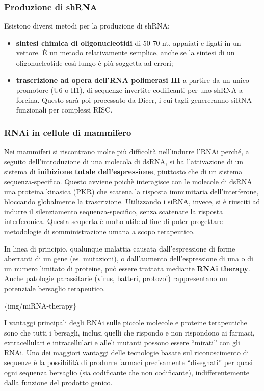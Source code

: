 \documentclass[]{article}
\begin{document}
\subsubsection{Produzione di shRNA}\label{produzione-di-shrna}

Esistono diversi metodi per la produzione di shRNA:

\begin{itemize}
\itemsep1pt\parskip0pt
\item
  \textbf{sintesi chimica di oligonucleotidi} di 50-70 nt, appaiati e
  ligati in un vettore. È un metodo relativamente semplice, anche se la
  sintesi di un oligonucleotide così lungo è più soggetta ad errori;
\item
  \textbf{trascrizione ad opera dell'RNA polimerasi III} a partire da un
  unico promotore (U6 o H1), di sequenze invertite codificanti per uno
  shRNA a forcina. Questo sarà poi processato da Dicer, i cui tagli
  genereranno siRNA funzionali per complessi RISC.
\end{itemize}

\subsubsection{RNAi in cellule di
mammifero}\label{rnai-in-cellule-di-mammifero}

Nei mammiferi si riscontrano molte più difficoltà nell'indurre l'RNAi
perché, a seguito dell'introduzione di una molecola di dsRNA, si ha
l'attivazione di un sistema di \textbf{inibizione totale
dell'espressione}, piuttosto che di un sistema sequenza-specifico.
Questo avviene poichè interagisce con le molecole di dsRNA una proteina
kinasica (PKR) che scatena la risposta immunitaria dell'interferone,
bloccando globalmente la trascrizione. Utilizzando i siRNA, invece, si è
riusciti ad indurre il silenziamento sequenza-specifico, senza scatenare
la risposta interferonica. Questa scoperta è molto utile al fine di
poter progettare metodologie di somministrazione umana a scopo
terapeutico.

In linea di principio, qualunque malattia causata dall'espressione di
forme aberranti di un gene (es. mutazioni), o dall'aumento
dell'espressione di una o di un numero limitato di proteine, può essere
trattata mediante \textbf{RNAi therapy}. Anche patologie parassitarie
(virus, batteri, protozoi) rappresentano un potenziale bersaglio
terapeutico.

\{img/miRNA-therapy\}

I vantaggi principali degli RNAi sulle piccole molecole e proteine
terapeutiche sono che tutti i bersagli, inclusi quelli che rispondo e
non rispondono ai farmaci, extracellulari e intracellulari e alleli
mutanti possono essere ``mirati'' con gli RNAi. Uno dei maggiori
vantaggi delle tecnologie basate sul riconoscimento di sequenze è la
possibilità di produrre farmaci precisamente ``disegnati'' per quasi
ogni sequenza bersaglio (sia codificante che non codificante),
indifferentemente dalla funzione del prodotto genico.
\end{document}
